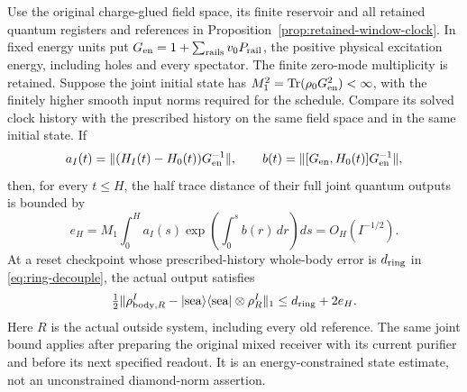 \begin{corollary}
\label{cor:joint-window-accuracy}
Use the original charge-glued field space, its finite reservoir and all
retained quantum registers and references in
Proposition~\ref{prop:retained-window-clock}. In fixed energy units put
$G_{\rm en}=1+\sum_{\rm rails}v_0P_{\rm rail}$, the positive physical
excitation energy, including holes and every spectator. The finite
zero-mode multiplicity is retained. Suppose the joint initial state
has $M_1^2=\operatorname{Tr}(\rho_0G_{\rm en}^2)<\infty$, with the
finitely higher smooth input norms required for the schedule.
Compare its solved clock history with the prescribed history on the
same field space and in the same initial state. If
\[
 a_I(t)=\|(H_I(t)-H_0(t))G_{\rm en}^{-1}\|,\qquad
 b(t)=\|[G_{\rm en},H_0(t)]G_{\rm en}^{-1}\|,
\]
then, for every $t\le H$, the half trace distance of their full joint
quantum outputs is bounded by
\begin{equation}
 e_H=M_1\int_0^H a_I(s)
                  \exp\!\left(\int_0^s b(r)\,dr\right)ds
       =O_H(I^{-1/2}).
 \label{eq:joint-window-error}
\end{equation}
At a reset checkpoint whose prescribed-history whole-body error is
$d_{\rm ring}$ in \eqref{eq:ring-decouple}, the actual output satisfies
\begin{equation}
 \tfrac12\|\rho_{{\rm body},R}^{I}
   -|{\rm sea}\rangle\langle{\rm sea}|\otimes\rho_R^{I}\|_1
       \le d_{\rm ring}+2e_H.
 \label{eq:joint-clock-reset}
\end{equation}
Here $R$ is the actual outside system, including every old reference.
The same joint bound applies after preparing the original mixed
receiver with its current purifier and before its next specified
readout. It is an energy-constrained state estimate, not an
unconstrained diamond-norm assertion.
\end{corollary}
